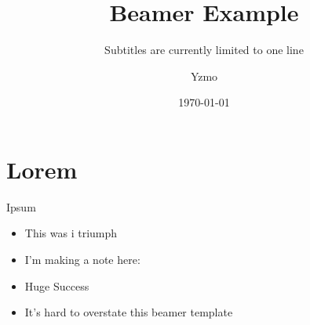 \documentclass[aspectratio=169]{beamer}
\title[Short title]{Beamer Example}
\author{Yzmo}
\subtitle{Subtitles are currently limited to one line}
\date{\today}
\institute{Lund University\\Department of Portals}
\begin{document}
\titleframe

\section{Lorem}
\begin{frame}{Ipsum}
			\begin{itemize}
				\item This was i triumph
				\item I'm making a note here:
				\item Huge Success
				\item It's hard to overstate this beamer template
			\end{itemize}
\end{frame}
\end{document}

